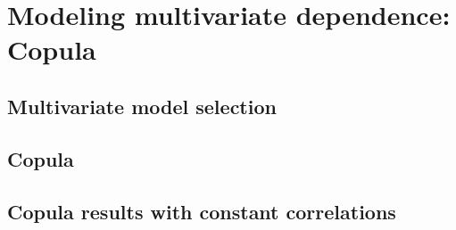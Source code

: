 \section{Modeling multivariate dependence: Copula} %


\subsection{Multivariate model selection}

\subsection{Copula}

\subsection{Copula results with constant correlations}
